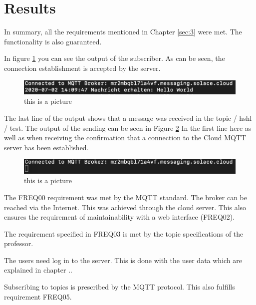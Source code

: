 \section{Results}
\label{sec:5}
In summary, all the requirements mentioned in Chapter \ref{sec:3} were met. The functionality is also guaranteed.

In figure \ref{subber} you can see the output of the subscriber. As can be seen, the connection establishment is accepted by the server. 
\begin{figure}
\sidecaption
\includegraphics[scale=0.75]{chapters/chapter1_dominic/sub.png}
\caption{this is a picture}
\label{subber}
\end{figure}
The last line of the output shows that a message was received in the topic / hshl / test. The output of the sending can be seen in Figure \ref{pubber} In the first line here as well as when receiving the confirmation that a connection to the Cloud MQTT server has been established.
\begin{figure}
\sidecaption
\includegraphics[scale=0.75]{chapters/chapter1_dominic/pub.png}
\caption{this is a picture}
\label{pubber}
\end{figure}

The FREQ00 requirement was met by the MQTT standard.
The broker can be reached via the Internet. This was achieved through the cloud server. This also ensures the requirement of maintainability with a web interface (FREQ02).

The requirement specified in FREQ03 is met by the topic specifications of the professor.

The users need log in to the server. This is done with the user data which are explained in chapter ..

Subscribing to topics is prescribed by the MQTT protocol. This also fulfills requirement FREQ05.



\newpage

